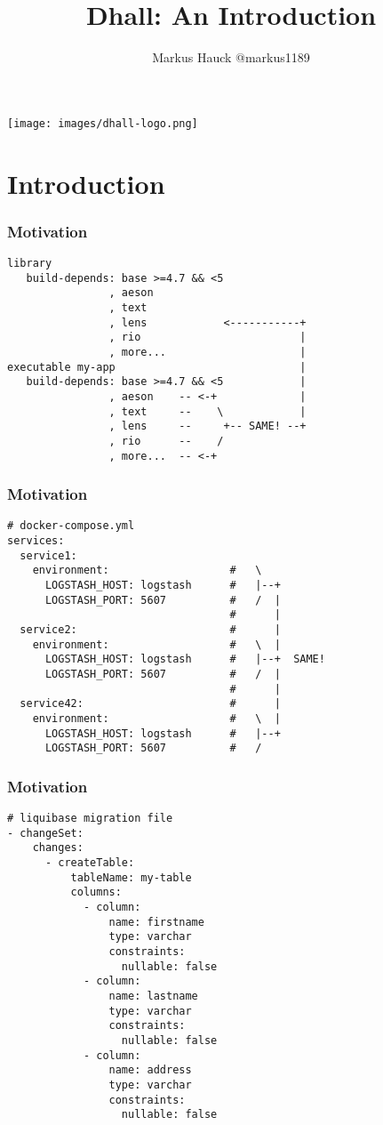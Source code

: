 \documentclass{beamer}
\title{Dhall: An Introduction}
\author{Markus Hauck @markus1189}
\begin{document}
\begin{frame}
  \begin{center}
    \texttt{[image: images/dhall-logo.png]}
  \end{center}
  \titlepage{}
\end{frame}

\section{Introduction}\label{sec:introduction}

\begin{frame}[fragile]
  \frametitle{Motivation}
  \begin{verbatim}
library
   build-depends: base >=4.7 && <5
                , aeson
                , text
                , lens            <-----------+
                , rio                         |
                , more...                     |
executable my-app                             |
   build-depends: base >=4.7 && <5            |
                , aeson    -- <-+             |
                , text     --    \            |
                , lens     --     +-- SAME! --+
                , rio      --    /
                , more...  -- <-+
  \end{verbatim}
\end{frame}

\begin{frame}[fragile]
  \frametitle{Motivation}
  \begin{verbatim}
# docker-compose.yml
services:
  service1:
    environment:                   #   \
      LOGSTASH_HOST: logstash      #   |--+
      LOGSTASH_PORT: 5607          #   /  |
                                   #      |
  service2:                        #      |
    environment:                   #   \  |
      LOGSTASH_HOST: logstash      #   |--+  SAME!
      LOGSTASH_PORT: 5607          #   /  |
                                   #      |
  service42:                       #      |
    environment:                   #   \  |
      LOGSTASH_HOST: logstash      #   |--+
      LOGSTASH_PORT: 5607          #   /
  \end{verbatim}
\end{frame}

\begin{frame}[fragile]
  \frametitle{Motivation}
  \begin{verbatim}
# liquibase migration file
- changeSet:
    changes:
      - createTable:
          tableName: my-table
          columns:
            - column:
                name: firstname
                type: varchar
                constraints:
                  nullable: false
            - column:
                name: lastname
                type: varchar
                constraints:
                  nullable: false
            - column:
                name: address
                type: varchar
                constraints:
                  nullable: false
  \end{verbatim}
\end{frame}
\end{document}

